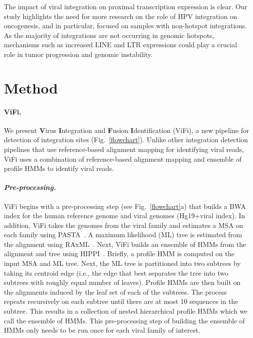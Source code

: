 \documentclass[10pt]{article}
\begin{document}
The impact of viral integration on proximal transcription expression is clear.  Our study highlights the need for more research on the role of HPV integration on oncogenesis, and in particular, focused on samples with non-hotspot integrations.  As the majority of integrations are not occurring in genomic hotspots, mechanisms such as increased LINE and LTR expressions could play a crucial role in tumor progression and genomic instability.  

 
\section*{Method}
\paragraph{\textbf{ViFi.}}
We present \textbf{V}irus \textbf{I}ntegration and \textbf{F}usion \textbf{I}dentification (ViFi), a new pipeline for detection of integration sites (Fig.~\ref{flowchart}).  Unlike other integration detection pipelines that use reference-based alignment mapping for identifying viral reads, ViFi uses a combination of reference-based alignment mapping and ensemble of profile HMMs to identify viral reads.  

\paragraph{\emph{Pre-processing.}} ViFi begins with a pre-processing step (see Fig.~\ref{flowchart}a) that builds a BWA index for the human reference genome and viral genomes (Hg19+viral index).  In addition, ViFi takes the genomes from the viral family and estimates a MSA on each family using PASTA~\cite{Mirarab2014}.  A maximum likelihood (ML) tree is estimated from the alignment using RAxML~\cite{Stamatakis2014}.  Next, ViFi builds an ensemble of HMMs from the alignment and tree using HIPPI~\cite{Nguyen2016_hippi}.  Briefly, a profile HMM is computed on the input MSA and ML tree.  Next, the ML tree is partitioned into two subtrees by taking its centroid edge (i.e., the edge that best separates the tree into two subtrees with roughly equal number of leaves).  Profile HMMs are then built on the alignments induced by the leaf set of each of the subtrees.  The process repeats recursively on each subtree until there are at most 10 sequences in the subtree.  This results in a collection of nested hierarchical profile HMMs which we call the ensemble of HMMs.  This pre-processing step of building the ensemble of HMMs only needs to be run once for each viral family of interest.
\end{document}

